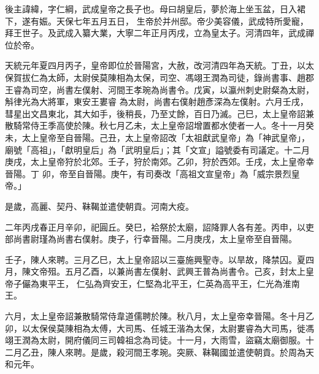 
\begin{pinyinscope}

 後主諱緯，字仁綱，武成皇帝之長子也。母曰胡皇后，夢於海上坐玉盆，日入裙下，遂有娠。天保七年五月五日，
 生帝於并州邸。帝少美容儀，武成特所愛寵，拜王世子。及武成入纂大業，大寧二年正月丙戌，立為皇太子。河清四年，武成禪位於帝。



 天統元年夏四月丙子，皇帝即位於晉陽宮，大赦，改河清四年為天統。丁丑，以太保賀拔仁為太師，太尉侯莫陳相為太保，司空、馮翊王潤為司徒，錄尚書事、趙郡王睿為司空，尚書左僕射、河間王孝琬為尚書令。戊寅，以瀛州刺史尉粲為太尉，斛律光為大將軍，東安王婁睿
 為太尉，尚書右僕射趙彥深為左僕射。六月壬戌，彗星出文昌東北，其大如手，後稍長，乃至丈餘，百日乃滅。己巳，太上皇帝詔兼散騎常侍王季高使於陳。秋七月乙未，太上皇帝詔增置都水使者一人。冬十一月癸未，太上皇帝至自晉陽。己丑，太上皇帝詔改「太祖獻武皇帝」為「神武皇帝」，廟號「高祖」，「獻明皇后」為「武明皇后」；其「文宣」謚號委有司議定。十二月庚戌，太上皇帝狩於北郊。壬子，狩於南郊。乙卯，狩於西郊。壬戌，太上皇帝幸晉陽。丁
 卯，帝至自晉陽。庚午，有司奏改「高祖文宣皇帝」為「威宗景烈皇帝。」



 是歲，高麗、契丹、靺鞨並遣使朝貢。河南大疫。



 二年丙戌春正月辛卯，祀圓丘。癸巳，袷祭於太廟，詔降罪人各有差。丙申，以吏部尚書尉瑾為尚書右僕射。庚子，行幸晉陽。二月庚戌，太上皇帝至自晉陽。



 壬子，陳人來聘。三月乙巳，太上皇帝詔以三臺施興聖寺。以旱故，降禁囚。夏四月，陳文帝殂。五月乙酉，以兼尚書左僕射、武興王普為尚書令。己亥，封太上皇帝子儼為東平王，
 仁弘為齊安王，仁堅為北平王，仁英為高平王，仁光為淮南王。



 六月，太上皇帝詔兼散騎常侍韋道儒聘於陳。秋八月，太上皇帝幸晉陽。冬十月乙卯，以太保侯莫陳相為太傅，大司馬、任城王湝為太保，太尉婁睿為大司馬，徙馮翊王潤為太尉，開府儀同三司韓祖念為司徒。十一月，大雨雪，盜竊太廟御服。十二月乙丑，陳人來聘。是歲，殺河間王孝琬。突厥、靺鞨國並遣使朝貢。於周為天和元年。




\end{pinyinscope}
